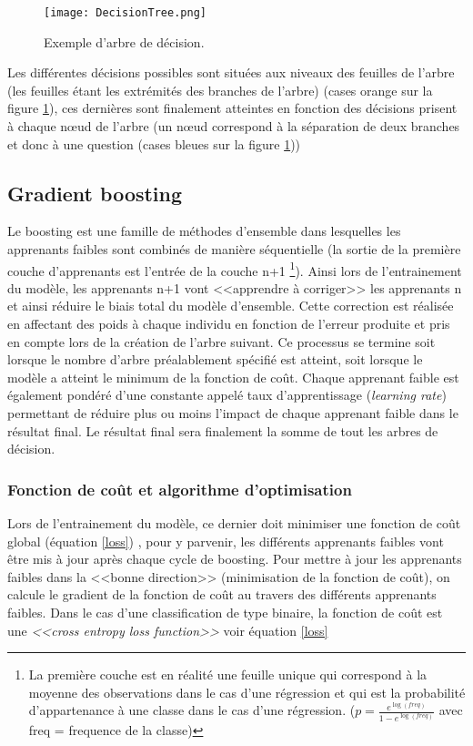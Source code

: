		\begin{figure}[H]
		\centering
		\caption{Exemple d'arbre de décision.}
		\label{figure:decision_tree}
		\texttt{[image: DecisionTree.png]}
		\end{figure}
		
		Les différentes décisions possibles sont situées aux niveaux des 
		feuilles de l'arbre (les feuilles étant les extrémités des branches de l'arbre) (cases orange sur la figure \ref{figure:decision_tree}),
		ces dernières sont finalement atteintes en fonction des décisions prisent à chaque
		n\oe ud de l'arbre (un n\oe ud correspond à la séparation de deux branches et donc 
		à une question (cases bleues sur la figure \ref{figure:decision_tree}))
		
		
	\subsection{Gradient boosting}
	
		Le boosting est une famille de méthodes d'ensemble dans lesquelles les apprenants faibles sont
		combinés de manière séquentielle (la sortie de la première couche d'apprenants est l'entrée
		de la couche n+1 \footnote{La première couche est en réalité une feuille unique 
		qui correspond à la moyenne des observations dans le cas d'une régression et qui est 
		la probabilité d'appartenance à une classe dans le cas d'une régression.
		($p=\frac{e^{\log(freq)}}{1 - e^{\log(freq)}}$ avec freq = frequence de la classe)}).
		Ainsi lors de l'entrainement du modèle, les apprenants
		n+1 vont <<apprendre à corriger>> les apprenants n et ainsi réduire le biais total du modèle d'ensemble.
		Cette correction est réalisée en affectant des poids à chaque individu en fonction de l'erreur produite
		et pris en compte lors de la création de l'arbre suivant.
		Ce processus se termine soit lorsque le nombre d'arbre préalablement spécifié est atteint, soit
		lorsque le modèle a atteint le minimum de la fonction de coût.	
		Chaque apprenant faible est également pondéré d'une constante appelé taux d'apprentissage (\emph{learning rate}) 
		permettant de réduire plus
		ou moins l'impact de chaque apprenant faible dans le résultat final.
		Le résultat final sera finalement la somme de tout les arbres de décision. 
		
		\subsubsection{Fonction de coût et algorithme d'optimisation}
		Lors de l'entrainement du modèle, ce dernier doit minimiser une fonction de coût global (équation \ref{loss}) \cite{NIPS2017_6907}\cite{geron2017hands-on},
		pour y parvenir, les différents apprenants faibles vont être mis à jour après chaque cycle
		de boosting. Pour mettre à jour les apprenants faibles dans la <<bonne direction>> (minimisation de 
		la fonction de coût), on calcule le gradient de la fonction de coût au travers des différents
		apprenants faibles. Dans le cas d'une classification de type binaire, la fonction de coût
		est une \emph{<<cross entropy loss function>>} voir équation \ref{loss}
		
